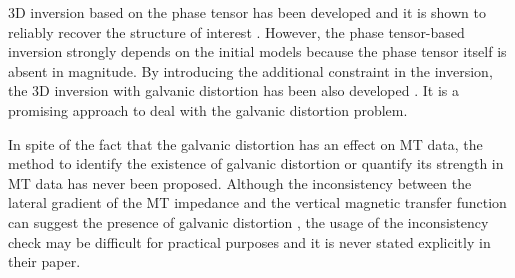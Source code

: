 	3D inversion based on the phase tensor \citep{caldwell2004a} has been developed and it is shown to reliably recover the structure of interest \citep{patro2013a, tietze2015a}.
	However, the phase tensor-based inversion strongly depends on the initial models because the phase tensor itself is absent in magnitude.
	By introducing the additional constraint in the inversion, the 3D inversion with galvanic distortion has been also developed \citep[e.g.,][]{sasaki2006a, avdeeva2015a}. It is a promising approach to deal with the galvanic distortion problem. 

	In spite of the fact that the galvanic distortion has an effect on MT data, the method to identify the existence of galvanic distortion or quantify its strength in MT data has never been proposed.
	Although the inconsistency between the lateral gradient of the MT impedance and the vertical magnetic transfer function can suggest the presence of galvanic distortion \citep[see][]{utada2000a}, the usage of the inconsistency check may be difficult for practical purposes and it is never stated explicitly in their paper.
	


